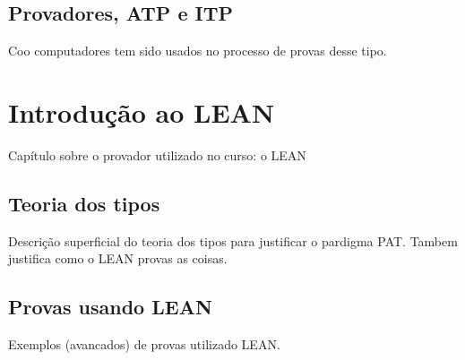 \section{Provadores, ATP e ITP}
Coo computadores tem sido usados no processo de provas desse tipo.

\chapter{Introdução ao LEAN}
Capítulo sobre o provador utilizado no curso: o LEAN

\section{Teoria dos tipos}
Descrição superficial do teoria dos tipos para justificar o pardigma PAT.
Tambem justifica como o LEAN provas as coisas.

\section{Provas usando LEAN}
Exemplos (avancados) de provas utilizado LEAN.
